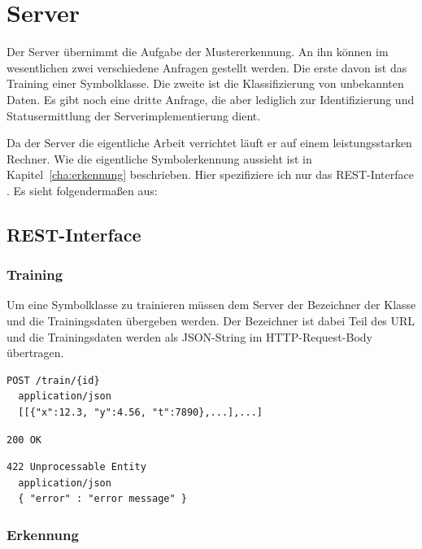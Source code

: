 

\section{Server} %
\label{sec:server}

Der Server übernimmt die Aufgabe der Mustererkennung. An ihn können im wesentlichen zwei verschiedene Anfragen gestellt werden. Die erste davon ist das Training einer Symbolklasse. Die zweite ist die Klassifizierung von unbekannten Daten. Es gibt noch eine dritte Anfrage, die aber lediglich zur Identifizierung und Statusermittlung der Serverimplementierung dient.

Da der Server die eigentliche Arbeit verrichtet läuft er auf einem leistungsstarken Rechner. Wie die eigentliche Symbolerkennung aussieht ist in Kapitel~\ref{cha:erkennung} beschrieben. Hier spezifiziere ich nur das \ac{REST}-Interface \cite{rest}. Es sieht folgendermaßen aus:

\subsection{REST-Interface} %
\label{sub:rest_interface}

\subsubsection{Training}

Um eine Symbolklasse zu trainieren müssen dem Server der Bezeichner der Klasse und die Trainingsdaten übergeben werden. Der Bezeichner ist dabei Teil des \ac{URL} und die Trainingsdaten werden als \ac{JSON}-String \cite{json} im \ac{HTTP}-Request-Body übertragen.

\begin{lstlisting}[caption={Anfrage}]
  POST /train/{id}
  application/json
  [[{"x":12.3, "y":4.56, "t":7890},...],...]
\end{lstlisting}
\begin{lstlisting}[caption={Antwort}]
  200 OK
\end{lstlisting}
\begin{lstlisting}[caption={Antwort im Fehlerfall}]
  422 Unprocessable Entity
  application/json
  { "error" : "error message" }
\end{lstlisting}

\subsubsection{Erkennung}
\label{subsub:erkennung}

